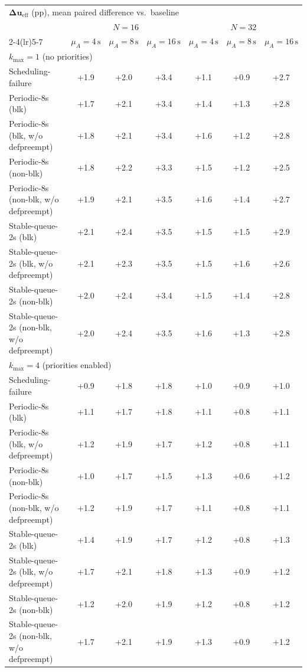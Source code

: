 \begin{tabular}{l c c c c c c}
\toprule
\multicolumn{7}{l}{$\mathbf{\Delta u_{\mathrm{eff}}}$ (pp), mean paired difference vs.\ baseline} \\
\addlinespace[0.2em]
& \multicolumn{3}{c}{$N=16$} & \multicolumn{3}{c}{$N=32$} \\
\cmidrule(lr){2-4}\cmidrule(lr){5-7}
& $\mu_A{=}4\,\mathrm{s}$ & $\mu_A{=}8\,\mathrm{s}$ & $\mu_A{=}16\,\mathrm{s}$ & $\mu_A{=}4\,\mathrm{s}$ & $\mu_A{=}8\,\mathrm{s}$ & $\mu_A{=}16\,\mathrm{s}$ \\
\midrule
\multicolumn{7}{l}{$k_{\max}=1$ (no priorities)} \\
\midrule
Scheduling-failure & +1.9 & +2.0 & +3.4 & +1.1 & +0.9 & +2.7 \\
Periodic-8s (blk) & +1.7 & +2.1 & +3.4 & +1.4 & +1.3 & +2.8 \\
Periodic-8s (blk, w/o defpreempt) & +1.8 & +2.1 & +3.4 & +1.6 & +1.2 & +2.8 \\
Periodic-8s (non-blk) & +1.8 & +2.2 & +3.3 & +1.5 & +1.2 & +2.5 \\
Periodic-8s (non-blk, w/o defpreempt) & +1.9 & +2.1 & +3.5 & +1.6 & +1.4 & +2.7 \\
Stable-queue-2s (blk) & +2.1 & +2.4 & +3.5 & +1.5 & +1.5 & +2.9 \\
Stable-queue-2s (blk, w/o defpreempt) & +2.1 & +2.3 & +3.5 & +1.5 & +1.6 & +2.6 \\
Stable-queue-2s (non-blk) & +2.0 & +2.4 & +3.4 & +1.5 & +1.4 & +2.8 \\
Stable-queue-2s (non-blk, w/o defpreempt) & +2.0 & +2.4 & +3.5 & +1.6 & +1.3 & +2.8 \\
\midrule
\multicolumn{7}{l}{$k_{\max}=4$ (priorities enabled)} \\
\midrule
Scheduling-failure & +0.9 & +1.8 & +1.8 & +1.0 & +0.9 & +1.0 \\
Periodic-8s (blk) & +1.1 & +1.7 & +1.8 & +1.1 & +0.8 & +1.1 \\
Periodic-8s (blk, w/o defpreempt) & +1.2 & +1.9 & +1.7 & +1.2 & +0.8 & +1.1 \\
Periodic-8s (non-blk) & +1.0 & +1.7 & +1.5 & +1.3 & +0.6 & +1.2 \\
Periodic-8s (non-blk, w/o defpreempt) & +1.2 & +1.9 & +1.7 & +1.1 & +0.8 & +1.1 \\
Stable-queue-2s (blk) & +1.4 & +1.9 & +1.7 & +1.2 & +0.8 & +1.3 \\
Stable-queue-2s (blk, w/o defpreempt) & +1.7 & +2.1 & +1.8 & +1.3 & +0.9 & +1.2 \\
Stable-queue-2s (non-blk) & +1.2 & +2.0 & +1.9 & +1.2 & +0.8 & +1.2 \\
Stable-queue-2s (non-blk, w/o defpreempt) & +1.7 & +2.1 & +1.9 & +1.3 & +0.9 & +1.2 \\
\bottomrule
\end{tabular}
